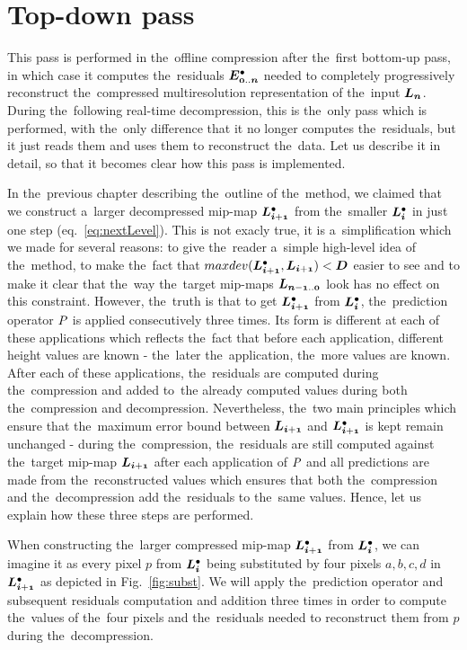 \section{Top-down pass}\label{sec:top-down}
This pass is performed in the~offline compression after the~first bottom-up pass, in which case it computes the~residuals $\objdot{E}{0..n}$ needed to completely progressively reconstruct the~compressed multiresolution representation of the~input $\lnorm{n}$. During the~following real-time decompression, this is the~only pass which is performed, with the~only difference that it no longer computes the~residuals, but it just reads them and uses them to reconstruct the~data. Let us describe it in detail, so that it becomes clear how this pass is implemented.

In the~previous chapter describing the~outline of the~method, we claimed that we construct a~larger decompressed mip-map $\ldot{i+1}$ from the~smaller $\ldot{i}$ in just one step (eq.~\ref{eq:nextLevel}). This is not exacly true, it is a~simplification which we made for several reasons: to give the~reader a~simple high-level idea of the~method, to make the~fact that $maxdev(\ldot{i+1}, \lnorm{i+1}) < \objnorm{D}{}$ easier to see and to make it clear that the~way the~target mip-maps $\lnorm{n-1..0}$ look has no effect on this constraint. However, the~truth is that to get $\ldot{i+1}$ from $\ldot{i}$, the~prediction operator $\mathit{P_{}}$ is applied consecutively three times. Its form is different at each of these applications which reflects the~fact that before each application, different height values are known - the~later the~application, the~more values are known. After each of these applications, the~residuals are computed during the~compression and added to~the already computed values during both the~compression and decompression. Nevertheless, the~two main principles which ensure that the~maximum error bound between $\lnorm{i+1}$ and $\ldot{i+1}$ is kept remain unchanged - during the~compression, the~residuals are still computed against the~target mip-map $\lnorm{i+1}$ after each application of $\mathit{P_{}}$ and all predictions are made from the~reconstructed values which ensures that both the~compression and the~decompression add the~residuals to the~same values. Hence, let us explain how these three steps are performed.

 When constructing the~larger compressed mip-map $\ldot{i+1}$ from $\ldot{i}$, we can imagine it as every pixel $p$ from $\ldot{i}$ being substituted by four pixels $a, b, c, d$ in $\ldot{i+1}$ as depicted in Fig.~\ref{fig:subst}. We will apply the~prediction operator and subsequent residuals computation and addition three times in order to compute the~values of the~four pixels and the~residuals needed to reconstruct them from $p$ during the~decompression.

